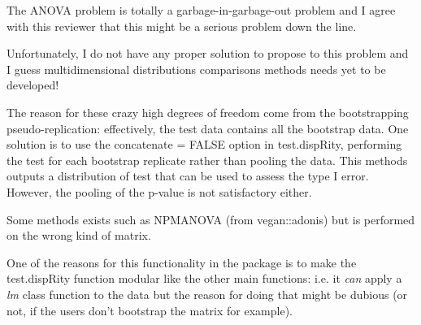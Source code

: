 \documentclass[12pt,letterpaper]{article}
\begin{document}
\begin{enumerate}
\begin{itemize}
\end{itemize}

The ANOVA problem is totally a garbage-in-garbage-out problem and I agree with this reviewer that this might be a serious problem down the line.

Unfortunately, I do not have any proper solution to propose to this problem and I guess multidimensional distributions comparisons methods needs yet to be developed!

The reason for these crazy high degrees of freedom come from the bootstrapping pseudo-replication: effectively, the test data contains all the bootstrap data.
One solution is to use the concatenate = FALSE option in test.dispRity, performing the test for each bootstrap replicate rather than pooling the data.
This methods outputs a distribution of test that can be used to assess the type I error.
However, the pooling of the p-value is not satisfactory either.

Some methods exists such as NPMANOVA (from vegan::adonis) but is performed on the wrong kind of matrix.

One of the reasons for this functionality in the package is to make the test.dispRity function modular like the other main functions: i.e. it \textit{can} apply a \textit{lm} class function to the data but the reason for doing that might be dubious (or not, if the users don't bootstrap the matrix for example).

%



\end{enumerate}
\end{document}
